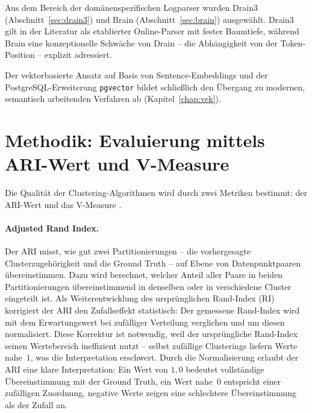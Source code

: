 Aus dem Bereich der domänenspezifischen Logparser wurden Drain3 
(Abschnitt~\ref{sec:drain3}) und Brain (Abschnitt~\ref{sec:brain}) 
ausgewählt. Drain3 gilt in der Literatur als etablierter Online-Parser 
mit fester Baumtiefe, während Brain eine konzeptionelle Schwäche von 
Drain -- die Abhängigkeit von der Token-Position -- explizit adressiert. 

Der vektorbasierte Ansatz auf Basis von
Sentence-Embeddings und der PostgreSQL-Erweiterung \texttt{pgvector}
bildet schließlich den Übergang zu modernen, semantisch arbeitenden
Verfahren ab (Kapitel~\ref{chap:vek}).

\section{Methodik: Evaluierung mittels ARI-Wert und V-Measure} \label{Vorgensweise}

Die Qualität der Clustering-Algorithmen wird durch zwei Metriken bestimmt: der \ac{ARI}-Wert \cite{gates2017impactrandommodelsclustering} und das V-Measure \cite{inproceedings}.

\paragraph{Adjusted Rand Index.}
Der \acs{ARI} \cite{YANG201719} misst, wie gut zwei
Partitionierungen -- die vorhergesagte Clusterzugehörigkeit und die
Ground Truth -- auf Ebene von Datenpunktpaaren übereinstimmen. Dazu
wird berechnet, welcher Anteil aller Paare in beiden Partitionierungen
übereinstimmend in denselben oder in verschiedene Cluster eingeteilt
ist. Als Weiterentwicklung des ursprünglichen Rand-Index (\acs{RI}) korrigiert
der ARI den Zufallseffekt statistisch: Der gemessene Rand-Index wird
mit dem Erwartungswert bei zufälliger Verteilung verglichen und um
diesen normalisiert. Diese Korrektur ist notwendig, weil der
ursprüngliche Rand-Index seinen Wertebereich ineffizient nutzt --
selbst zufällige Clusterings liefern Werte nahe~$1$, was die
Interpretation erschwert. Durch die Normalisierung erlaubt der ARI eine
klare Interpretation: Ein Wert von $1{,}0$ bedeutet vollständige
Übereinstimmung mit der Ground Truth, ein Wert nahe~$0$ entspricht
einer zufälligen Zuordnung, negative Werte zeigen eine schlechtere
Übereinstimmung als der Zufall an.

